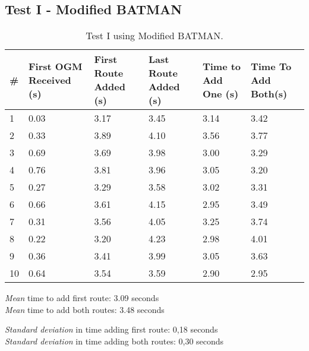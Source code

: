\subsection{Test I - Modified BATMAN}
\begin{table}[h!]
	\centering
	\begin{tabular}{| l || p{24mm} || p{22mm} | p{22mm} || p{20mm} |  p{20mm} |}\hline
 		\textbf{\#} & \textbf{First OGM Received (s)} & \textbf{First Route Added (s)} & \textbf{Last Route Added (s)} & \textbf{Time to Add One (s)} & \textbf{Time To Add Both(s)}\\\hline
 		 1 & 0.03 & 3.17 & 3.45 & 3.14 & 3.42\\\hline
 		 2 & 0.33 & 3.89 & 4.10 & 3.56 & 3.77\\\hline
 		 3 & 0.69 & 3.69 & 3.98 & 3.00 & 3.29\\\hline
 		 4 & 0.76 & 3.81 & 3.96 & 3.05 & 3.20\\\hline
 		 5 & 0.27 & 3.29 & 3.58 & 3.02 & 3.31\\\hline
 		 6 & 0.66 & 3.61 & 4.15 & 2.95 & 3.49\\\hline
 		 7 & 0.31 & 3.56 & 4.05 & 3.25 & 3.74\\\hline
 		 8 & 0.22 & 3.20 & 4.23 & 2.98 & 4.01\\\hline
 		 9 & 0.36 & 3.41 & 3.99 & 3.05 & 3.63\\\hline
 		10 & 0.64 & 3.54 & 3.59 & 2.90 & 2.95\\\hline  
	\end{tabular}
	\caption{Test I using Modified BATMAN.}
	\label{tab:test1_secure}
\end{table}

\emph{Mean} time to add first route: 3.09 seconds\\
\emph{Mean} time to add both routes: 3.48 seconds

\emph{Standard deviation} in time adding first route: 0,18 seconds\\
\emph{Standard deviation} in time adding both routes: 0,30 seconds

